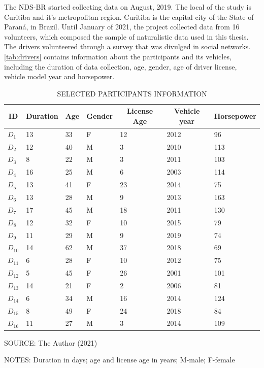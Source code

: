 The NDS-BR started collecting data on August, 2019. The local of the study is Curitiba and it's metropolitan region. Curitiba is the capital city of the State of Paraná, in Brazil. Until January of 2021, the project collected data from 16 volunteers, which composed the sample of naturalistic data used in this thesis. The drivers volunteered through a survey that was divulged in social networks. \autoref{tab:drivers} contains information about the participants and its vehicles, including the duration of data collection, age, gender, age of driver license, vehicle model year and horsepower.

\begin{table}[!htbp]
    \footnotesize
    \captionsetup{justification=raggedright,
        singlelinecheck=false,
        font=footnotesize}
    \caption{SELECTED PARTICIPANTS INFORMATION}
    \centering
    \begin{tabular}{lllllll}
        \hline
        \multicolumn{1}{c}{\textbf{ID}} & \multicolumn{1}{c}{\textbf{Duration}} & \multicolumn{1}{c}{\textbf{Age}} & \multicolumn{1}{c}{\textbf{Gender}} & \multicolumn{1}{c}{\textbf{License Age}} & \multicolumn{1}{c}{\textbf{Vehicle year}} & \multicolumn{1}{c}{\textbf{Horsepower}} \\
        \hline
        $D_1$ & 13 & 33 & F & 12 & 2012 & 96 \\
        $D_2$ & 12 & 40 & M & 3 & 2010 & 113 \\
        $D_3$ & 8 & 22 & M & 3 & 2011 & 103 \\
        $D_4$ & 16 & 25 & M & 6 & 2003 & 114 \\
        $D_5$ & 13 & 41 & F & 23 & 2014 & 75 \\
        $D_6$ & 13 & 28 & M & 9 & 2013 & 163 \\
        $D_7$ & 17 & 45 & M & 18 & 2011 & 130 \\
        $D_8$ & 12 & 32 & F & 10 & 2015 & 79 \\
        $D_9$ & 11 & 29 & M & 9 & 2019 & 74 \\
        $D_{10}$ & 14 & 62 & M & 37 & 2018 & 69 \\
        $D_{11}$ & 6 & 28 & F & 10 & 2012 & 75 \\
        $D_{12}$ & 5 & 45 & F & 26 & 2001 & 101 \\
        $D_{13}$ & 14 & 21 & F & 2 & 2006 & 81 \\
        $D_{14}$ & 6 & 34 & M & 16 & 2014 & 124 \\
        $D_{15}$ & 8 & 49 & F & 24 & 2018 & 84 \\
        $D_{16}$ & 11 & 27 & M & 3 & 2014 & 109 \\
        \hline
    \end{tabular}
    \label{tab:drivers}
    \par \vspace{2mm} \footnotesize \raggedright
    SOURCE: The Author (2021)
    \par \vspace{1mm} \footnotesize \raggedright
    NOTES: Duration in days; age and license age in years; M-male; F-female
\end{table}

